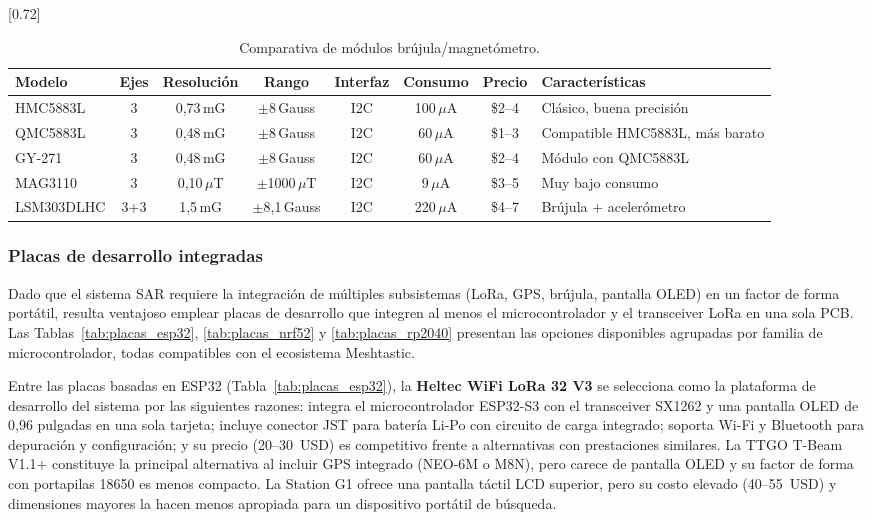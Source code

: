\begin{table}[H]
\begin{center}
\caption{Comparativa de módulos brújula/magnetómetro.}
\scalebox{0.72}[0.72]{
\begin{tabular}{| l | c | c | c | c | c | c | l |}
\hline
 \textbf{Modelo} & \textbf{Ejes} & \textbf{Resolución} & \textbf{Rango} & \textbf{Interfaz} & \textbf{Consumo} & \textbf{Precio} & \textbf{Características} \\
\hline
\hline
 HMC5883L & 3 & 0,73\,mG & $\pm$8\,Gauss & I2C & 100\,$\mu$A & \$2--4 & Clásico, buena precisión \\
 QMC5883L & 3 & 0,48\,mG & $\pm$8\,Gauss & I2C & 60\,$\mu$A & \$1--3 & Compatible HMC5883L, más barato \\
 GY-271 & 3 & 0,48\,mG & $\pm$8\,Gauss & I2C & 60\,$\mu$A & \$2--4 & Módulo con QMC5883L \\
 MAG3110 & 3 & 0,10\,$\mu$T & $\pm$1000\,$\mu$T & I2C & 9\,$\mu$A & \$3--5 & Muy bajo consumo \\
 LSM303DLHC & 3+3 & 1,5\,mG & $\pm$8,1\,Gauss & I2C & 220\,$\mu$A & \$4--7 & Brújula + acelerómetro \\
\hline
\end{tabular}}
\label{tab:modulos_brujula}
\end{center}
\end{table}

\subsubsection{Placas de desarrollo integradas}

Dado que el sistema SAR requiere la integración de múltiples subsistemas (LoRa, GPS, brújula, pantalla OLED) en un factor de forma portátil, resulta ventajoso emplear placas de desarrollo que integren al menos el microcontrolador y el transceiver LoRa en una sola PCB. Las Tablas~\ref{tab:placas_esp32}, \ref{tab:placas_nrf52} y \ref{tab:placas_rp2040} presentan las opciones disponibles agrupadas por familia de microcontrolador, todas compatibles con el ecosistema Meshtastic.

Entre las placas basadas en ESP32 (Tabla~\ref{tab:placas_esp32}), la \textbf{Heltec WiFi LoRa 32 V3} se selecciona como la plataforma de desarrollo del sistema por las siguientes razones: integra el microcontrolador ESP32-S3 con el transceiver SX1262 y una pantalla OLED de 0,96 pulgadas en una sola tarjeta; incluye conector JST para batería Li-Po con circuito de carga integrado; soporta Wi-Fi y Bluetooth para depuración y configuración; y su precio (20--30~USD) es competitivo frente a alternativas con prestaciones similares. La TTGO T-Beam V1.1+ constituye la principal alternativa al incluir GPS integrado (NEO-6M o M8N), pero carece de pantalla OLED y su factor de forma con portapilas 18650 es menos compacto. La Station G1 ofrece una pantalla táctil LCD superior, pero su costo elevado (40--55~USD) y dimensiones mayores la hacen menos apropiada para un dispositivo portátil de búsqueda.

